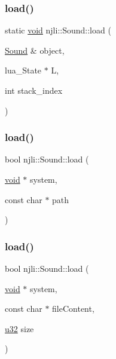 \mbox{\label{classnjli_1_1_sound_a41494cb822b91e70ec894f8eb2bfdd54}} 
\subsubsection{\texorpdfstring{load()}{load()}\hspace{0.1cm}{\footnotesize\ttfamily [1/3]}}
{\footnotesize\ttfamily static \mbox{\hyperlink{_thread_8h_af1e856da2e658414cb2456cb6f7ebc66}{void}} njli\+::\+Sound\+::load (\begin{DoxyParamCaption}\item[{\mbox{\hyperlink{classnjli_1_1_sound}{Sound}} \&}]{object,  }\item[{lua\+\_\+\+State $\ast$}]{L,  }\item[{int}]{stack\+\_\+index }\end{DoxyParamCaption})\hspace{0.3cm}{\ttfamily [static]}}

\mbox{\label{classnjli_1_1_sound_a56f596a7daacc96a7f6127dc75d12866}} 
\subsubsection{\texorpdfstring{load()}{load()}\hspace{0.1cm}{\footnotesize\ttfamily [2/3]}}
{\footnotesize\ttfamily bool njli\+::\+Sound\+::load (\begin{DoxyParamCaption}\item[{\mbox{\hyperlink{_thread_8h_af1e856da2e658414cb2456cb6f7ebc66}{void}} $\ast$}]{system,  }\item[{const char $\ast$}]{path }\end{DoxyParamCaption})}

\mbox{\label{classnjli_1_1_sound_ae1637016ca27ecf2259b5428ae3a5f41}} 
\subsubsection{\texorpdfstring{load()}{load()}\hspace{0.1cm}{\footnotesize\ttfamily [3/3]}}
{\footnotesize\ttfamily bool njli\+::\+Sound\+::load (\begin{DoxyParamCaption}\item[{\mbox{\hyperlink{_thread_8h_af1e856da2e658414cb2456cb6f7ebc66}{void}} $\ast$}]{system,  }\item[{const char $\ast$}]{file\+Content,  }\item[{\mbox{\hyperlink{_util_8h_a10e94b422ef0c20dcdec20d31a1f5049}{u32}}}]{size }\end{DoxyParamCaption})}

